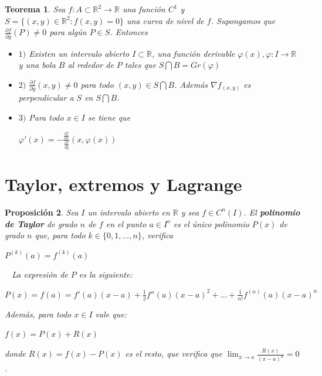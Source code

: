 \documentclass[]{article}
\newtheorem{teo}{Teorema}
\newtheorem{prop}[teo]{Proposición}
\def\R{\mathbb{R}}
\newcommand{\dprim}[2]{\frac{\partial #1}{\partial #2}}
\begin{document}
\begin{teo}
	Sea $f:A\subset \R^2\to\R$ una función $C^1$ y $S = \{(x,y)\in\R^2:f(x,y)=0\}$ una curva de nivel de $f$. Supongamos que $\dprim{f}{y}(P) \neq 0$ para algún $P\in S$. Entonces
	\begin{itemize}
		\item $1)$ Existen un intervalo abierto $I\subset \R$, una función derivable $\varphi(x), \varphi:I\to\R$ y una bola $B$ al rededor de $P$ tales que $S \bigcap B = Gr(\varphi)$
		\item $2)$ $\dprim{f}{y}(x,y)\neq 0$ para todo $(x,y)\in S\bigcap B$. Además $\nabla f_{(x,y)}$ es perpendicular a $S$ en $S \bigcap B$.
		\item $3)$ Para todo $x\in I$ se tiene que
		\begin{center}
			$\displaystyle \varphi'(x) = -\frac{\dprim{f}{x}}{\dprim{f}{y}}(x,\varphi(x))$
		\end{center}
	\end{itemize}
\end{teo}

\newpage
\section{Taylor, extremos y Lagrange}
\begin{prop}
	Sea $I$ un intervalo abierto en $\R$ y sea $f \in C^n(I)$. El \textbf{polinomio de Taylor} de grado $n$ de $f$ en el punto $a\in I^o$ es el único polinomio $P(x)$ de grado $n$ que, para todo $k\in \{0,1,\hdots,n\}$, verifica 
	\begin{center}
		$P^{(k)}(a) = f^{(k)}(a)$
	\end{center}
	~\newline
	La expresión de $P$ es la siguiente:
	\begin{center}
		$P(x) = f(a) = f'(a)(x-a) + \frac{1}{2}f''(a)(x-a)^2 + \hdots + \frac{1}{n!}f^{(n)}(a)(x-a)^n$
	\end{center}
	Además, para todo $x\in I$ vale que:
	\begin{center}
		$f(x) = P(x) + R(x)$
	\end{center}
	donde $R(x) = f(x) - P(x)$ es el resto, que verifica que $\displaystyle \lim_{x\to a}\frac{R(x)}{(x-a)^n} = 0$.
\end{prop}
\end{document}
